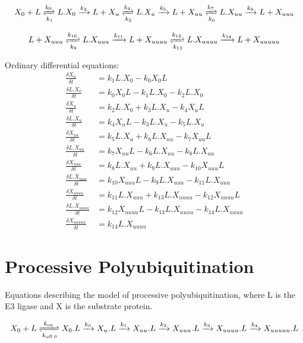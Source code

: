 \documentclass[11pt]{article}
\begin{document}
\begin{equation}
  X_0 + L \xrightleftharpoons[k_1]{k_0} L.X_0
  \xrightarrow[]{k_2} L + X_u
  \xrightleftharpoons[k_3]{k_4} L.X_u
  \xrightarrow[]{k_5} L + X_{uu}
  \xrightleftharpoons[k_6]{k_7} L.X_{uu}
  \xrightarrow[]{k_8} L + X_{uuu}
\end{equation}

\begin{equation}
  L + X_{uuu} \xrightleftharpoons[k_9]{k_{10}} L.X_{uuu}
  \xrightarrow[]{k_{11}} L + X_{uuuu}
  \xrightleftharpoons[k_{13}]{k_{12}} L.X_{uuuu}
  \xrightarrow[]{k_{14}} L + X_{uuuuu}
\end{equation}

Ordinary differential equations:
\begin{align}
  \frac{\delta X_0}{\delta t} &= k_1 L.X_0 - k_0 X_0 L \\
  \frac{\delta L.X_0}{\delta t} &= k_0 X_0 L - k_1 L.X_0 - k_2 L.X_0 \\
  \frac{\delta X_{u}}{\delta t} &= k_{2} L.X_{0} + k_{3} L.X_{u} - k_{4} X_{u} L\\
  \frac{\delta L.X_{u}}{\delta t} &= k_{4} X_{u} L - k_{3} L.X_{u} - k_{5} L.X_{u}\\
  \frac{\delta X_{uu}}{\delta t} &= k_{5} L.X_{u} + k_{6} L.X_{uu} - k_{7} X_{uu} L\\
  \frac{\delta L.X_{uu}}{\delta t} &= k_{7} X_{uu} L - k_{6} L.X_{uu} - k_{8} L.X_{uu} \\
  \frac{\delta X_{uuu}}{\delta t} &= k_{8} L.X_{uu} + k_{9} L.X_{uuu} - k_{10} X_{uuu} L\\
  \frac{\delta L.X_{uuu}}{\delta t} &= k_{10} X_{uuu} L - k_{9} L.X_{uuu} - k_{11} L.X_{uuu}\\
  \frac{\delta X_{uuuu}}{\delta t} &= k_{11} L.X_{uuu} + k_{13} L.X_{uuuu} - k_{12} X_{uuuu} L\\
  \frac{\delta L.X_{uuuu}}{\delta t} &= k_{12} X_{uuuu} L - k_{13} L.X_{uuuu} - k_{14} L.X_{uuuu}\\
  \frac{\delta X_{uuuuu}}{\delta t} &= k_{14} L.X_{uuuu}
\end{align}

\section{Processive Polyubiquitination}
Equations describing the  model of processive polyubiquitination, where L is the E3 ligase and X is the substrate protein.

\begin{equation}
  X_0 + L \xrightleftharpoons[k_\text{off 0}]{k_\text{on}} X_0.L
  \xrightarrow[]{k_0} X_u.L
  \xrightarrow[]{k_1} X_{uu}.L
  \xrightarrow[]{k_2} X_{uuu}.L
  \xrightarrow[]{k_3} X_{uuuu}.L
  \xrightarrow[]{k_4} X_{uuuuu}.L
\end{equation}
\end{document}
